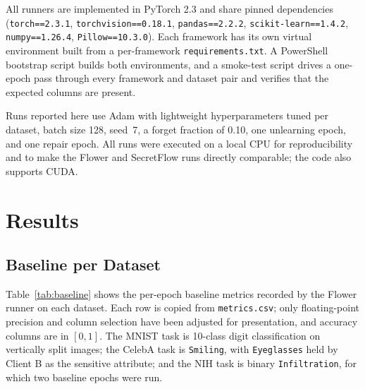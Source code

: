 \documentclass[sigconf,anonymous]{acmart}
\begin{document}
All runners are implemented in PyTorch 2.3 and share pinned dependencies (\texttt{torch==2.3.1}, \texttt{torchvision==0.18.1}, \texttt{pandas==2.2.2}, \texttt{scikit-learn==1.4.2}, \texttt{numpy==1.26.4}, \texttt{Pillow==10.3.0}). Each framework has its own virtual environment built from a per-framework \texttt{requirements.txt}. A PowerShell bootstrap script builds both environments, and a smoke-test script drives a one-epoch pass through every framework and dataset pair and verifies that the expected columns are present.

Runs reported here use Adam with lightweight hyperparameters tuned per dataset, batch size 128, seed~7, a forget fraction of 0.10, one unlearning epoch, and one repair epoch. All runs were executed on a local CPU for reproducibility and to make the Flower and SecretFlow runs directly comparable; the code also supports CUDA.

\section{Results}

\subsection{Baseline per Dataset}

Table~\ref{tab:baseline} shows the per-epoch baseline metrics recorded by the Flower runner on each dataset. Each row is copied from \texttt{metrics.csv}; only floating-point precision and column selection have been adjusted for presentation, and accuracy columns are in $[0,1]$. The MNIST task is 10-class digit classification on vertically split images; the CelebA task is \texttt{Smiling}, with \texttt{Eyeglasses} held by Client B as the sensitive attribute; and the NIH task is binary \texttt{Infiltration}, for which two baseline epochs were run.
\end{document}
